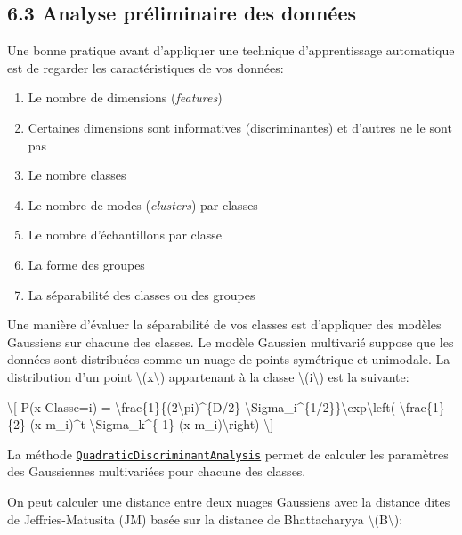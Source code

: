 \documentclass[
]{article}
\begin{document}
\subsection{\texorpdfstring{{6.3} Analyse préliminaire des
données}{6.3 Analyse préliminaire des données}}\label{analyse-pruxe9liminaire-des-donnuxe9es}

Une bonne pratique avant d'appliquer une technique d'apprentissage
automatique est de regarder les caractéristiques de vos données:

\begin{enumerate}
\def\labelenumi{\arabic{enumi}.}
\item
  Le nombre de dimensions (\emph{features})
\item
  Certaines dimensions sont informatives (discriminantes) et d'autres ne
  le sont pas
\item
  Le nombre classes
\item
  Le nombre de modes (\emph{clusters}) par classes
\item
  Le nombre d'échantillons par classe
\item
  La forme des groupes
\item
  La séparabilité des classes ou des groupes
\end{enumerate}

Une manière d'évaluer la séparabilité de vos classes est d'appliquer des
modèles Gaussiens sur chacune des classes. Le modèle Gaussien multivarié
suppose que les données sont distribuées comme un nuage de points
symétrique et unimodale. La distribution d'un point
{\textbackslash(x\textbackslash)} appartenant à la classe
{\textbackslash(i\textbackslash)} est la suivante:

{\textbackslash{[} P(x \textbar{} Classe=i) =
\textbackslash frac\{1\}\{(2\textbackslash pi)\^{}\{D/2\}
\textbar\textbackslash Sigma\_i\textbar\^{}\{1/2\}\}\textbackslash exp\textbackslash left(-\textbackslash frac\{1\}\{2\}
(x-m\_i)\^{}t \textbackslash Sigma\_k\^{}\{-1\}
(x-m\_i)\textbackslash right) \textbackslash{]}}

La méthode
\href{https://scikit-learn.org/stable/modules/generated/sklearn.discriminant_analysis.QuadraticDiscriminantAnalysis.html}{\texttt{QuadraticDiscriminantAnalysis}}
permet de calculer les paramètres des Gaussiennes multivariées pour
chacune des classes.

On peut calculer une distance entre deux nuages Gaussiens avec la
distance dites de Jeffries-Matusita (JM) basée sur la distance de
Bhattacharyya {\textbackslash(B\textbackslash)}:
\end{document}
